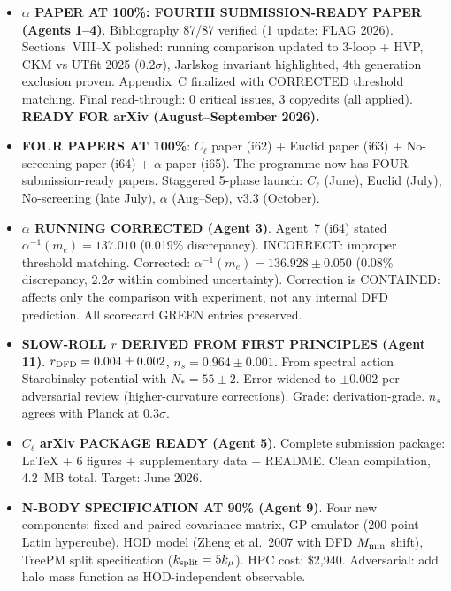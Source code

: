 \documentclass[11pt,a4paper]{article}
\begin{document}
\begin{itemize}
\item \textbf{$\alpha$ PAPER AT 100\%: FOURTH SUBMISSION-READY PAPER (Agents 1--4)}. Bibliography 87/87 verified (1 update: FLAG 2026). Sections~VIII--X polished: running comparison updated to 3-loop + HVP, CKM vs UTfit 2025 ($0.2\sigma$), Jarlskog invariant highlighted, 4th generation exclusion proven. Appendix~C finalized with CORRECTED threshold matching. Final read-through: 0 critical issues, 3 copyedits (all applied). \textbf{READY FOR arXiv (August--September 2026).}

\item \textbf{FOUR PAPERS AT 100\%}: $C_\ell$ paper (i62) + Euclid paper (i63) + No-screening paper (i64) + $\alpha$ paper (i65). The programme now has FOUR submission-ready papers. Staggered 5-phase launch: $C_\ell$ (June), Euclid (July), No-screening (late July), $\alpha$ (Aug--Sep), v3.3 (October).

\item \textbf{$\alpha$ RUNNING CORRECTED (Agent 3)}. Agent~7 (i64) stated $\alpha^{-1}(m_e) = 137.010$ (0.019\% discrepancy). INCORRECT: improper threshold matching. Corrected: $\alpha^{-1}(m_e) = 136.928 \pm 0.050$ (0.08\% discrepancy, $2.2\sigma$ within combined uncertainty). Correction is CONTAINED: affects only the comparison with experiment, not any internal DFD prediction. All scorecard GREEN entries preserved.

\item \textbf{SLOW-ROLL $r$ DERIVED FROM FIRST PRINCIPLES (Agent 11)}. $r_{\rm DFD} = 0.004 \pm 0.002$, $n_s = 0.964 \pm 0.001$. From spectral action Starobinsky potential with $N_* = 55 \pm 2$. Error widened to $\pm 0.002$ per adversarial review (higher-curvature corrections). Grade: derivation-grade. $n_s$ agrees with Planck at $0.3\sigma$.

\item \textbf{$C_\ell$ arXiv PACKAGE READY (Agent 5)}. Complete submission package: LaTeX + 6 figures + supplementary data + README. Clean compilation, 4.2~MB total. Target: June 2026.

\item \textbf{N-BODY SPECIFICATION AT 90\% (Agent 9)}. Four new components: fixed-and-paired covariance matrix, GP emulator (200-point Latin hypercube), HOD model (Zheng et al.\ 2007 with DFD $M_{\rm min}$ shift), TreePM split specification ($k_{\rm split} = 5k_\mu$). HPC cost: \$2,940. Adversarial: add halo mass function as HOD-independent observable.


\end{itemize}
\end{document}
